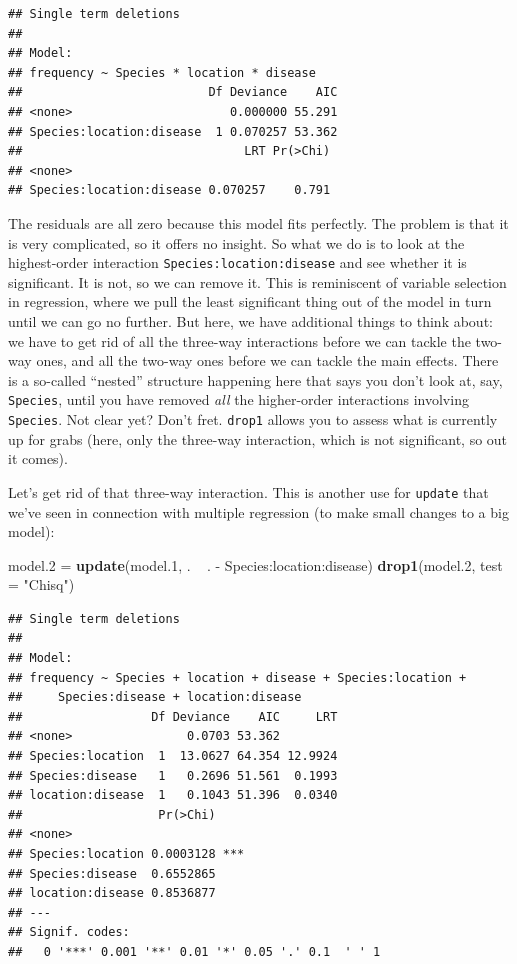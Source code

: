 \documentclass[]{tufte-book}
\newenvironment{Shaded}{}{}
\newcommand{\DataTypeTok}[1]{\textcolor[rgb]{0.56,0.13,0.00}{#1}}
\newcommand{\FloatTok}[1]{\textcolor[rgb]{0.25,0.63,0.44}{#1}}
\newcommand{\KeywordTok}[1]{\textcolor[rgb]{0.00,0.44,0.13}{\textbf{#1}}}
\newcommand{\NormalTok}[1]{#1}
\newcommand{\OperatorTok}[1]{\textcolor[rgb]{0.40,0.40,0.40}{#1}}
\newcommand{\StringTok}[1]{\textcolor[rgb]{0.25,0.44,0.63}{#1}}
\theoremstyle{definition}
\theoremstyle{definition}
\theoremstyle{definition}
\theoremstyle{remark}
\begin{document}
\begin{verbatim}
## Single term deletions
## 
## Model:
## frequency ~ Species * location * disease
##                          Df Deviance    AIC
## <none>                      0.000000 55.291
## Species:location:disease  1 0.070257 53.362
##                               LRT Pr(>Chi)
## <none>                                    
## Species:location:disease 0.070257    0.791
\end{verbatim}

The residuals are all zero because this model fits perfectly. The
problem is that it is very complicated, so it offers no insight. So what
we do is to look at the highest-order interaction
\texttt{Species:location:disease} and see whether it is significant. It
is not, so we can remove it. This is reminiscent of variable selection
in regression, where we pull the least significant thing out of the
model in turn until we can go no further. But here, we have additional
things to think about: we have to get rid of all the three-way
interactions before we can tackle the two-way ones, and all the two-way
ones before we can tackle the main effects. There is a so-called
``nested'' structure happening here that says you don't look at, say,
\texttt{Species}, until you have removed \emph{all} the higher-order
interactions involving \texttt{Species}. Not clear yet? Don't fret.
\texttt{drop1} allows you to assess what is currently up for grabs
(here, only the three-way interaction, which is not significant, so out
it comes).

Let's get rid of that three-way interaction. This is another use for
\texttt{update} that we've seen in connection with multiple regression
(to make small changes to a big model):

\begin{Shaded}
\begin{Highlighting}[]
\NormalTok{model}\FloatTok{.2}\NormalTok{ =}\StringTok{ }\KeywordTok{update}\NormalTok{(model}\FloatTok{.1}\NormalTok{, . }\OperatorTok{~}\StringTok{ }\NormalTok{. }\OperatorTok{-}\StringTok{ }\NormalTok{Species}\OperatorTok{:}\NormalTok{location}\OperatorTok{:}\NormalTok{disease)}
\KeywordTok{drop1}\NormalTok{(model}\FloatTok{.2}\NormalTok{, }\DataTypeTok{test =} \StringTok{"Chisq"}\NormalTok{)}
\end{Highlighting}
\end{Shaded}

\begin{verbatim}
## Single term deletions
## 
## Model:
## frequency ~ Species + location + disease + Species:location + 
##     Species:disease + location:disease
##                  Df Deviance    AIC     LRT
## <none>                0.0703 53.362        
## Species:location  1  13.0627 64.354 12.9924
## Species:disease   1   0.2696 51.561  0.1993
## location:disease  1   0.1043 51.396  0.0340
##                   Pr(>Chi)    
## <none>                        
## Species:location 0.0003128 ***
## Species:disease  0.6552865    
## location:disease 0.8536877    
## ---
## Signif. codes:  
##   0 '***' 0.001 '**' 0.01 '*' 0.05 '.' 0.1  ' ' 1
\end{verbatim}
\end{document}

